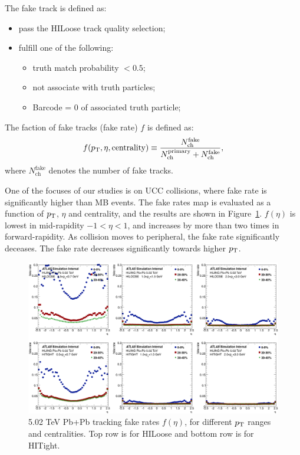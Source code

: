 The fake track is defined as:
\begin{itemize}
\item pass the HILoose track quality selection;
\item fulfill one of the following:
\begin{itemize}
\item truth match probability $<0.5$;
\item not associate with truth particles;
\item Barcode = 0 of associated truth particle;
\end{itemize}
\end{itemize}

The faction of fake tracks (fake rate) $f$ is defined as:
\begin{equation}
f(p_\text{T}, \eta, \text{centrality}) \equiv \frac{N_\text{ch}^\text{fake}}{N_\text{ch}^\text{primary} + N_\text{ch}^\text{fake}},
\end{equation}
where $N_\text{ch}^\text{fake}$ denotes the number of fake tracks.

One of the focuses of our studies is on UCC collisions, where fake rate is significantly higher than MB events. The fake rates map is evaluated as a function of $p_\text{T}$, $\eta$ and centrality, and the results are shown in Figure~\ref{fig:detector_ATLAS_track_fake_PbPb502}. $f(\eta)$ is lowest in mid-rapidity $-1<\eta<1$, and increases by more than two times in forward-rapidity. As collision moves to peripheral, the fake rate significantly deceases. The fake rate decreases significantly towards higher $p_\text{T}$.

\begin{figure}[H]
\centering
\includegraphics[width=.95\linewidth]{figs/chapter_detector/ATLAS_track_fake_PbPb502.png}
\caption{5.02 TeV Pb+Pb tracking fake rates $f(\eta)$, for different $p_\text{T}$ ranges and centralities. Top row is for HILoose and bottom row is for HITight.}
\label{fig:detector_ATLAS_track_fake_PbPb502}
\end{figure}

